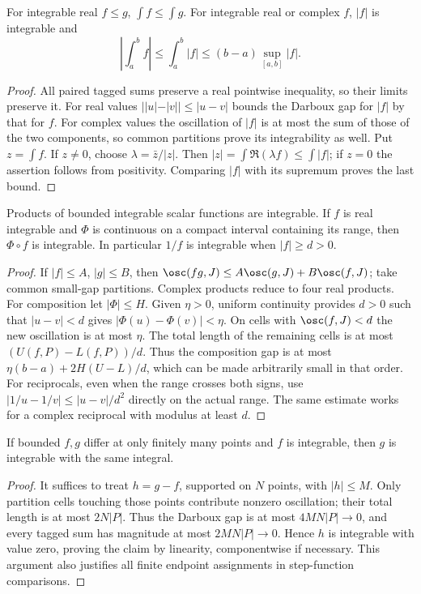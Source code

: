 \begin{theorem}
For integrable real $f\le g$, $\int f\le\int g$. For integrable real
or complex $f$, $|f|$ is integrable and
\[\left|\int_a^bf\right|\le\int_a^b|f|\le(b-a)\sup_{[a,b]}|f|.
\]
\end{theorem}
\begin{proof}
All paired tagged sums preserve a real pointwise inequality, so their
limits preserve it. For real values $||u|-|v||\le|u-v|$ bounds the
Darboux gap for $|f|$ by that for $f$. For complex values the oscillation
of $|f|$ is at most the sum of those of the two components, so common
partitions prove its integrability as well. Put $z=\int f$. If $z\ne0$,
choose $\lambda=\bar z/|z|$. Then
$|z|=\int\Re(\lambda f)\le\int|f|$; if $z=0$ the assertion follows
from positivity. Comparing $|f|$ with its supremum proves the last bound.
\end{proof}

\begin{theorem}
Products of bounded integrable scalar functions are integrable. If $f$ is
real integrable and $\Phi$ is continuous on a compact interval containing
its range, then $\Phi\circ f$ is integrable. In particular $1/f$ is
integrable when $|f|\ge d>0$.
\end{theorem}
\begin{proof}
If $|f|\le A$, $|g|\le B$, then
$\osc(fg,J)\le A\osc(g,J)+B\osc(f,J)$; take common small-gap
partitions. Complex products reduce to four real products.
For composition let $|\Phi|\le H$. Given $\eta>0$, uniform continuity
provides $d>0$ such that $|u-v|<d$ gives
$|\Phi(u)-\Phi(v)|<\eta$. On cells with $\osc(f,J)<d$ the new
oscillation is at most $\eta$. The total length of the remaining cells
is at most $(U(f,P)-L(f,P))/d$. Thus the composition gap is at most
$\eta(b-a)+2H(U-L)/d$, which can be made arbitrarily small in that order.
For reciprocals, even when the range crosses both signs, use
$|1/u-1/v|\le|u-v|/d^2$ directly on the actual range. The same estimate
works for a complex reciprocal with modulus at least $d$.
\end{proof}

\begin{theorem}
If bounded $f,g$ differ at only finitely many points and $f$ is integrable,
then $g$ is integrable with the same integral.
\end{theorem}
\begin{proof}
It suffices to treat $h=g-f$, supported on $N$ points, with $|h|\le M$.
Only partition cells touching those points contribute nonzero oscillation;
their total length is at most $2N|P|$. Thus the Darboux gap is at most
$4MN|P|\to0$, and every tagged sum has magnitude at most
$2MN|P|\to0$. Hence $h$ is integrable with value zero, proving the
claim by linearity, componentwise if necessary. This argument also
justifies all finite endpoint assignments in step-function comparisons.
\end{proof}

